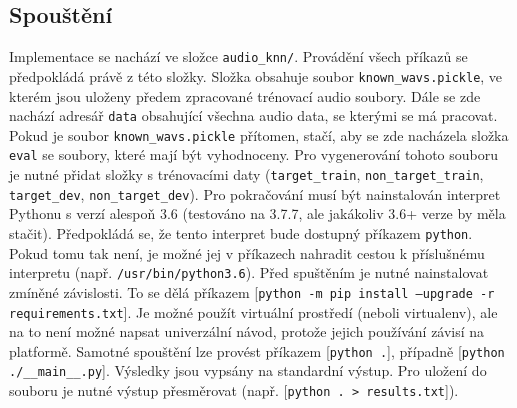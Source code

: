 \documentclass[a4paper,11pt]{article}
\begin{document}
			\subsection{Spouštění}
				Implementace se nachází ve složce \texttt{audio\_knn/}. Provádění všech příkazů se předpokládá právě z této složky. Složka obsahuje soubor \texttt{known\_wavs.pickle}, ve kterém jsou uloženy předem zpracované trénovací audio soubory.
				Dále se zde nachází adresář \texttt{data} obsahující všechna audio data, se kterými se má pracovat. Pokud je soubor \texttt{known\_wavs.pickle} přítomen, stačí, aby se zde nacházela složka \texttt{eval} se soubory, které mají být vyhodnoceny. Pro vygenerování tohoto souboru je nutné přidat složky s trénovacími daty (\texttt{target\_train}, \texttt{non\_target\_train}, \texttt{target\_dev}, \texttt{non\_target\_dev}).
				Pro pokračování musí být nainstalován interpret Pythonu s verzí alespoň 3.6 (testováno na 3.7.7, ale jakákoliv 3.6+ verze by měla stačit). Předpokládá se, že tento interpret bude dostupný příkazem \texttt{python}. Pokud tomu tak není, je možné jej v příkazech nahradit cestou k příslušnému interpretu (např. \texttt{/usr/bin/python3.6}).
				Před spuštěním je nutné nainstalovat zmíněné závislosti. To se dělá příkazem [\texttt{python -m pip install --upgrade -r requirements.txt}]. Je možné použít virtuální prostředí (neboli virtualenv), ale na to není možné napsat univerzální návod, protože jejich používání závisí na platformě.
				Samotné spouštění lze provést příkazem [\texttt{python .}], případně [\texttt{python ./\_\_main\_\_.py}]. Výsledky jsou vypsány na standardní výstup. Pro uložení do souboru je nutné výstup přesměrovat (např. [\texttt{python . > results.txt}]).
\end{document}
